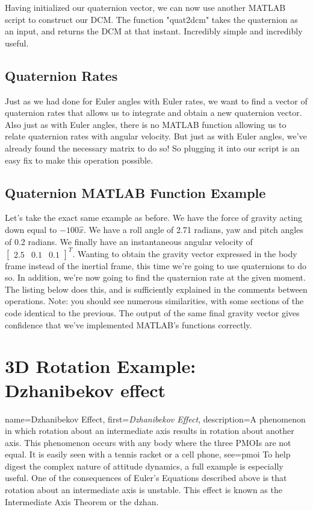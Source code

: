 \documentclass[12pt]{report}
\begin{document}
{Having initialized our quaternion vector, we can now use another MATLAB script to construct our DCM. The function "quat2dcm" takes the quaternion as an input, and returns the DCM at that instant. Incredibly simple and incredibly useful. 


\subsection{Quaternion Rates}\label{sec: quaternion rates}

Just as we had done for Euler angles with Euler rates, we want to find a vector of quaternion rates that allows us to integrate and obtain a new quaternion vector. Also just as with Euler angles, there is no MATLAB function allowing us to relate quaternion rates with angular velocity. But just as with Euler angles, we've already found the necessary matrix to do so! So plugging it into our script is an easy fix to make this operation possible.

\subsection{Quaternion MATLAB Function Example}

Let's take the exact same example as before. We have the force of gravity acting down equal to $-100\hat{x}$. We have a roll angle of 2.71 radians, yaw and pitch angles of 0.2 radians. We finally have an instantaneous angular velocity of $\begin{bmatrix}
    2.5&0.1&0.1
\end{bmatrix}^T$. Wanting to obtain the gravity vector expressed in the body frame instead of the inertial frame, this time we're going to use quaternions to do so. In addition, we're now going to find the quaternion rate at the given moment. The listing below does this, and is sufficiently explained in the comments between operations. Note: you should see numerous similarities, with some sections of the code identical to the previous. The output of the same final gravity vector gives confidence that we've implemented MATLAB's functions correctly.


\section{3D Rotation Example: Dzhanibekov effect}\label{sec:Dzhan}

{
    name={Dzhanibekov Effect},
    first=\textit{Dzhanibekov Effect},
    description={A phenomenon in which rotation about an intermediate axis results in rotation about another axis. This phenomenon occurs with any body where the three PMOIs are not equal. It is easily seen with a tennis racket or a cell phone},
    see={pmoi}
}
To help digest the complex nature of attitude dynamics, a full example is especially useful. One of the consequences of Euler's Equations described %
above is that rotation about an intermediate axis is unstable. This effect is known as the Intermediate Axis Theorem or the \gls{dzhan}.

}
\end{document}
